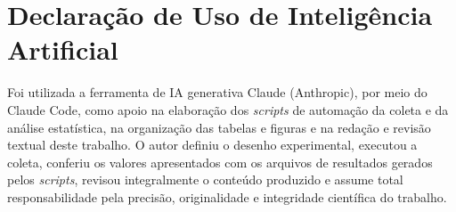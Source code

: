 \section*{Declaração de Uso de Inteligência Artificial}
Foi utilizada a ferramenta de IA generativa Claude (Anthropic), por meio do Claude Code, como apoio na elaboração dos \textit{scripts} de automação da coleta e da análise estatística, na organização das tabelas e figuras e na redação e revisão textual deste trabalho. O autor definiu o desenho experimental, executou a coleta, conferiu os valores apresentados com os arquivos de resultados gerados pelos \textit{scripts}, revisou integralmente o conteúdo produzido e assume total responsabilidade pela precisão, originalidade e integridade científica do trabalho.
